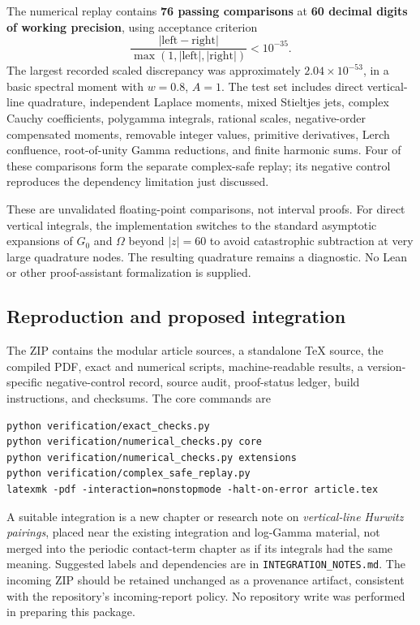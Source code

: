 \documentclass[11pt,a4paper]{article}
\theoremstyle{definition}
\numberwithin{equation}{section}
\begin{document}
The numerical replay contains \textbf{76 passing comparisons} at
\textbf{60 decimal digits of working precision}, using acceptance
criterion
\[
 \frac{|\text{left}-\text{right}|}{\max(1,|\text{left}|,|\text{right}|)}
      <10^{-35}.
\]
The largest recorded scaled discrepancy was approximately
$2.04\times10^{-53}$, in a basic spectral moment with $w=0.8$, $A=1$.
The test set includes direct vertical-line quadrature, independent
Laplace moments, mixed Stieltjes jets, complex Cauchy coefficients,
polygamma integrals, rational scales, negative-order compensated
moments, removable integer values, primitive derivatives, Lerch
confluence, root-of-unity Gamma reductions, and finite harmonic sums.
Four of these comparisons form the separate complex-safe replay; its
negative control reproduces the dependency limitation just discussed.

These are unvalidated floating-point comparisons, not interval proofs.
For direct vertical integrals, the implementation switches to the
standard asymptotic expansions of $G_0$ and $\Omega$ beyond $|z|=60$
to avoid catastrophic subtraction at very large quadrature nodes.
The resulting quadrature remains a diagnostic. No Lean or other
proof-assistant formalization is supplied.

\subsection{Reproduction and proposed integration}
The ZIP contains the modular article sources, a standalone TeX source,
the compiled PDF, exact and numerical scripts, machine-readable results,
a version-specific negative-control record, source audit, proof-status
ledger, build instructions, and checksums. The core commands are
\begin{verbatim}
python verification/exact_checks.py
python verification/numerical_checks.py core
python verification/numerical_checks.py extensions
python verification/complex_safe_replay.py
latexmk -pdf -interaction=nonstopmode -halt-on-error article.tex
\end{verbatim}

A suitable integration is a new chapter or research note on
\emph{vertical-line Hurwitz pairings}, placed near the existing integration
and log-Gamma material, not merged into the periodic contact-term chapter
as if its integrals had the same meaning. Suggested labels and dependencies
are in \texttt{INTEGRATION\_NOTES.md}. The incoming ZIP should be retained
unchanged as a provenance artifact, consistent with the repository's
incoming-report policy. No repository write was performed in preparing
this package.
\end{document}
